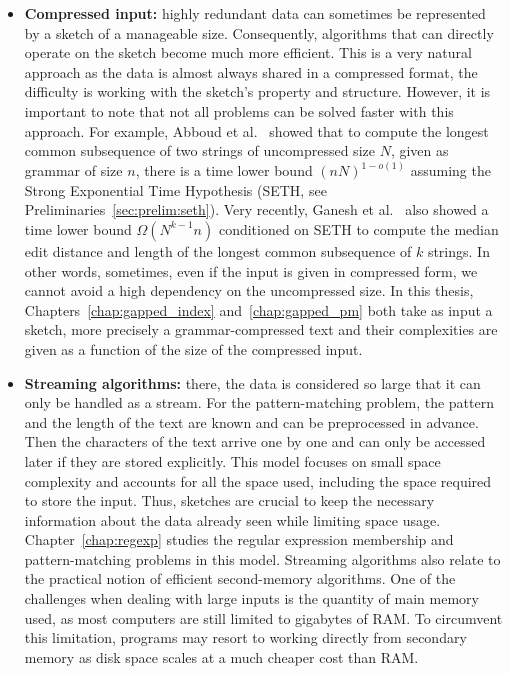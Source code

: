 \begin{itemize}
\item \textbf{Compressed input:} highly redundant data can sometimes be represented by a sketch of a manageable size. 
Consequently, algorithms that can directly operate on the sketch become much more efficient. This is a very natural approach as the data is almost always shared in a compressed format, the difficulty is working with the sketch's property and structure. However, it is important to note that not all problems can be solved faster with this approach. For example, Abboud et al.~\cite{abboud2017fine} showed that to compute the longest common subsequence of two strings of uncompressed size $N$, given as grammar of size $n$, there is a time lower bound $(nN)^{1-o(1)}$ assuming the Strong Exponential Time Hypothesis (SETH, see Preliminaries~\ref{sec:prelim:seth}). 
Very recently, Ganesh et al.~\cite{ganesh2022compression} also showed a time lower bound $\Omega(N^{k-1}n)$ conditioned on SETH to compute the median edit distance and length of the longest common subsequence of $k$ strings.
In other words, sometimes, even if the input is given in compressed form, we cannot avoid a high dependency on the uncompressed size. In this thesis, Chapters~\ref{chap:gapped_index} and~\ref{chap:gapped_pm} both take as input a sketch, more precisely a grammar-compressed text and their complexities are given as a function of the size of the compressed input.
%
\item \textbf{Streaming algorithms:} there, the data is considered so large that it can only be handled as a stream.
For the pattern-matching problem, the pattern and the length of the text are known and can be preprocessed in advance. Then the characters of the text arrive one by one and can only be accessed later if they are stored explicitly. 
This model focuses on small space complexity and accounts for all the space used, including the space required to store the input.
Thus, sketches are crucial to keep the necessary information about the data already seen while limiting space usage.
Chapter~\ref{chap:regexp} studies the regular expression membership and pattern-matching problems in this model.
Streaming algorithms also relate to the practical notion of efficient second-memory algorithms. One of the challenges when dealing with large inputs is the quantity of main memory used, as most computers are still limited to gigabytes of RAM. To circumvent this limitation, programs may resort to working directly from secondary memory as disk space scales at a much cheaper cost than RAM.

\end{itemize}
